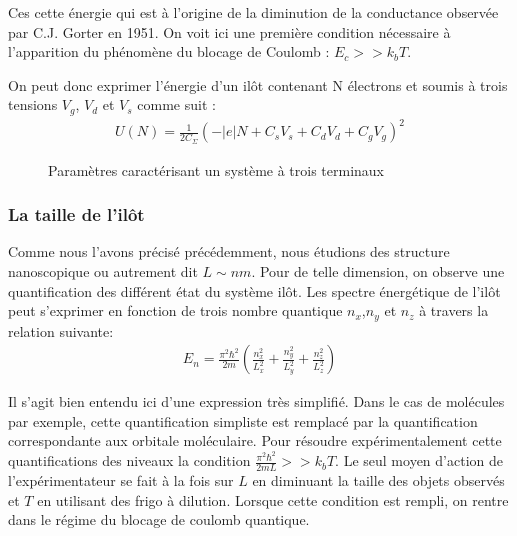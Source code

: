 Ces cette énergie qui est à l'origine de la diminution de la conductance observée par C.J. Gorter en 1951. On voit ici une première condition nécessaire à l'apparition du phénomène du blocage de Coulomb : $E_c >> k_bT$.

On peut donc exprimer l'énergie d'un il\^ot contenant N électrons et soumis à trois tensions $V_g$, $V_d$ et $V_s$ comme suit :
\begin{eqnarray}
U(N) = \frac{1}{2C_{\Sigma}} (-|e|N + C_sV_s + C_dV_d + C_gV_g)^2
\end{eqnarray}

\begin{figure}
\caption{Paramètres caractérisant un système à trois terminaux}
\label{description_systeme}
\end{figure}



\subsubsection{La taille de l'il\^ot}
Comme nous l'avons précisé précédemment, nous étudions des structure nanoscopique ou autrement dit $L\sim nm$. Pour de telle dimension, on observe une quantification des différent état du système il\^ot. Les spectre énergétique de l'il\^ot peut s'exprimer en fonction de trois nombre quantique $n_x$,$n_y$ et $n_z$ à travers la relation suivante:
\begin{eqnarray}
E_n = \frac{\pi^2 \hbar^2}{2m}(\frac{n_x^2}{L_x^2} + \frac{n_y^2}{L_y^2} + \frac{n_z^2}{L_z^2}) \nonumber
\end{eqnarray}


Il s'agit bien entendu ici d'une expression très simplifié. Dans le cas de molécules par exemple, cette quantification simpliste est remplacé par la quantification correspondante aux orbitale moléculaire. Pour résoudre expérimentalement cette quantifications des niveaux la condition $\frac{\pi^2 \hbar^2}{2mL} >> k_bT$. Le seul moyen d'action de l'expérimentateur se fait à la fois sur $L$ en diminuant la taille des objets observés et $T$ en utilisant des frigo à dilution. Lorsque cette condition est rempli, on rentre dans le régime du blocage de coulomb quantique.
\newline


